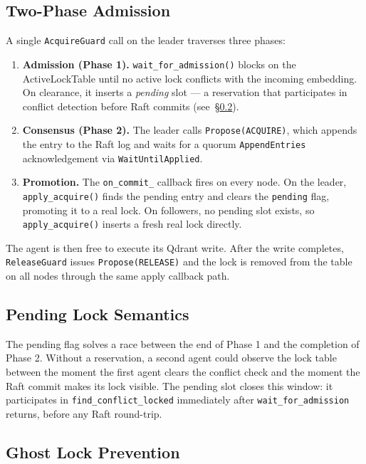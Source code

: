 \documentclass[sigconf]{acmart}
\begin{document}
\subsection{Two-Phase Admission}
\label{sec:two-phase}

A single \texttt{AcquireGuard} call on the leader traverses three phases:

\begin{enumerate}
\item \textbf{Admission (Phase 1).} \texttt{wait\_for\_admission()} blocks on the
  ActiveLockTable until no active lock conflicts with the incoming embedding. On
  clearance, it inserts a \emph{pending} slot — a reservation that participates in
  conflict detection before Raft commits (see~\S\ref{sec:pending}).

\item \textbf{Consensus (Phase 2).} The leader calls \texttt{Propose(ACQUIRE)}, which
  appends the entry to the Raft log and waits for a quorum \texttt{AppendEntries}
  acknowledgement via \texttt{WaitUntilApplied}.

\item \textbf{Promotion.} The \texttt{on\_commit\_} callback fires on every node.
  On the leader, \texttt{apply\_acquire()} finds the pending entry and clears the
  \texttt{pending} flag, promoting it to a real lock. On followers, no pending slot
  exists, so \texttt{apply\_acquire()} inserts a fresh real lock directly.
\end{enumerate}

The agent is then free to execute its Qdrant write. After the write completes,
\texttt{ReleaseGuard} issues \texttt{Propose(RELEASE)} and the lock is removed from
the table on all nodes through the same apply callback path.

\subsection{Pending Lock Semantics}
\label{sec:pending}

The pending flag solves a race between the end of Phase 1 and the completion of
Phase 2. Without a reservation, a second agent could observe the lock table between
the moment the first agent clears the conflict check and the moment the Raft commit
makes its lock visible. The pending slot closes this window: it participates in
\texttt{find\_conflict\_locked} immediately after \texttt{wait\_for\_admission} returns,
before any Raft round-trip.

\subsection{Ghost Lock Prevention}
\label{sec:ghost}
\end{document}
